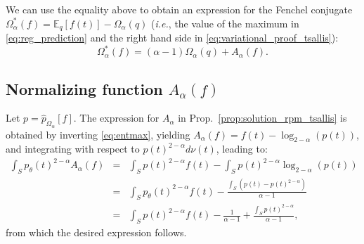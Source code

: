 \documentclass{article}
\begin{document}
We can use the equality above to obtain an expression for the Fenchel conjugate $\Omega_\alpha^*(f) = \mathbb{E}_q[f(t)] - \Omega_\alpha(q)$ ({\it i.e.}, the value of the maximum in \eqref{eq:reg_prediction} and the right hand side in \eqref{eq:variational_proof_tsallis}):
\begin{equation}
\Omega_\alpha^*(f) = (\alpha-1)\Omega_{\alpha}(q) + A_\alpha(f).
\end{equation}

\subsection{Normalizing function $A_\alpha(f)$}\label{sec:A_alpha}

Let $p = \hat{p}_{\Omega_\alpha}[f]$. 
The expression for $A_\alpha$ in Prop.~\ref{prop:solution_rpm_tsallis} is
obtained by inverting \eqref{eq:entmax}, yielding
$A_\alpha(f) = f(t) - \log_{2-\alpha}(p(t))$,  and integrating with respect to  $p(t)^{2-\alpha} d\nu(t)$, leading to:
\begin{eqnarray}
\int_S p_\theta(t)^{2-\alpha} A_\alpha(f) &=& \int_S p(t)^{2-\alpha} f(t) - \int_S p(t)^{2-\alpha} \log_{2-\alpha}(p(t))\nonumber\\
&=& \int_S p_\theta(t)^{2-\alpha} f(t) - \frac{\int_S  (p(t) - p(t)^{2-\alpha})}{\alpha-1} \nonumber\\
&=& \int_S p(t)^{2-\alpha} f(t) - \frac{1}{\alpha-1} + \frac{\int_S  p(t)^{2-\alpha}}{\alpha-1},
\end{eqnarray}
from which the desired expression follows.


\begin{comment}
\section{Normalizing Function for $\alpha$-Sparse Families}\label{sec:A_alpha}

The expression for $A_\alpha$ in \eqref{eq:A_alpha} is
obtained by inverting \eqref{eq:alpha_sparse_family}, yielding
$A_\alpha(\theta) = \theta^\top \phi(t) - \log_{2-\alpha}(p_\theta(t))$,  and integrating with respect to  $p_\theta(t)^{2-\alpha} d\mu(t)$, leading to:
\begin{eqnarray}
\int_S p_\theta(t)^{2-\alpha} A_\alpha(\theta) &=& \int_S p_\theta(t)^{2-\alpha} \theta^\top \phi(t) - \int_S p_\theta(t)^{2-\alpha} \log_{2-\alpha}(p_\theta(t))\nonumber\\
&=& \int_S p_\theta(t)^{2-\alpha} \theta^\top \phi(t) - \frac{\int_S  (p_\theta(t) - p_\theta(t)^{2-\alpha})}{\alpha-1} \nonumber\\
&=& \int_S p_\theta(t)^{2-\alpha} \theta^\top \phi(t) - \frac{1}{\alpha-1} + \frac{\int_S  p_\theta(t)^{2-\alpha}}{\alpha-1}.
\end{eqnarray}
\end{comment}
\end{document}
